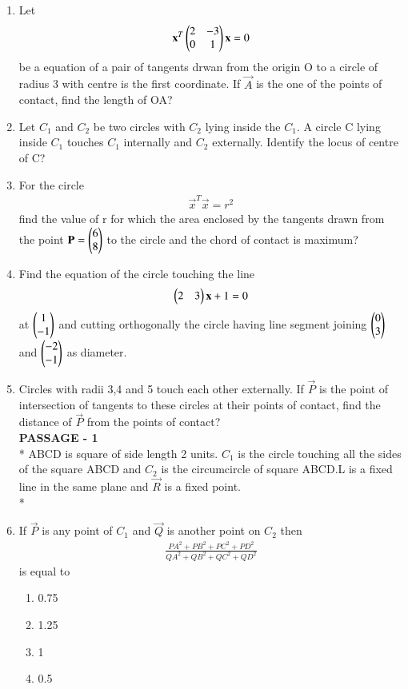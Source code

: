 \begin{enumerate}[label=\arabic*.,ref=\thesubsection.\theenumi]
\item Let 
\begin{align}
\mathbf{x}^T \begin{pmatrix}2 & -3 \\ 0 & 1\end{pmatrix} \mathbf{x}=0
\end{align}
be a equation of a pair of tangents drwan from the origin O to a circle of radius 3 with centre is the first coordinate. If $\vec{A}$ is the one of the points of contact, find the length of OA?
   
\item Let $C_1$ and $C_2$ be two circles with $C_2$ lying inside the $C_1$. A circle C lying inside $C_1$ touches $C_1$ internally and $C_2$ externally. Identify the locus of centre of C?
    
\item For the circle 
\begin{align}
\vec{x}^T\vec{x}=r^2
\end{align}
find the value of r for which the area enclosed by the tangents drawn from the point $\mathbf{P}=\begin{pmatrix}6\\8\end{pmatrix}$ to the circle and the chord of contact is maximum?
    
\item Find the equation of the circle touching  the line 
\begin{align}
\begin{pmatrix}2&3\end{pmatrix}\mathbf{x}+1=0
\end{align}
at $\begin{pmatrix}1 \\-1\end{pmatrix}$ and cutting orthogonally the circle having line segment joining $\begin{pmatrix}0 \\ 3\end{pmatrix}$ and $\begin{pmatrix}-2 \\ -1\end{pmatrix}$ as diameter.
 
\item Circles with radii 3,4 and 5 touch each other externally. If $\vec{P}$ is the point of intersection of tangents to these circles at their  points of contact, find the distance of $\vec{P}$ from the points of contact?\\

\textbf{PASSAGE - 1}\\*
ABCD is square of side length 2 units. $C_1$ is the circle touching all the sides of the square ABCD and $C_2$ is the circumcircle of square ABCD.L is a fixed line in the same plane and $\vec{R}$ is a fixed point.\\*

\item If $\vec{P}$ is any point of $C_1$ and $\vec{Q}$ is another point on $C_2$ then 
\begin{align}
\frac{PA^2+PB^2+PC^2+PD^2}{QA^2+QB^2+QC^2+QD^2}
\end{align} 
is equal to
\begin{enumerate}
\item 0.75
\item 1.25
\item 1
\item 0.5
\end{enumerate}
    

\end{enumerate}
